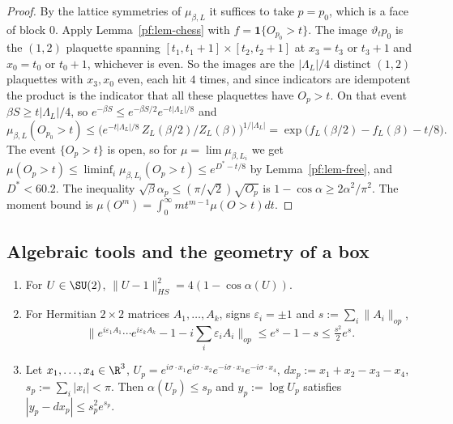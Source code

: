 \begin{proof}
By the lattice symmetries of $\mu_{\beta,L}$ it suffices to take $p=p_0$, which is a face of block $0$. Apply Lemma~\ref{pf:lem-chess} with $f=\mathbf 1\{O_{p_0}>t\}$. The image $\vartheta_tp_0$ is the $(1,2)$ plaquette spanning $[t_1,t_1+1]\times[t_2,t_2+1]$ at $x_3=t_3$ or $t_3+1$ and $x_0=t_0$ or $t_0+1$, whichever is even. So the images are the $|\Lambda_L|/4$ distinct $(1,2)$ plaquettes with $x_3,x_0$ even, each hit $4$ times, and since indicators are idempotent the product is the indicator that all these plaquettes have $O_p>t$. On that event $\beta S\ge t|\Lambda_L|/4$, so $e^{-\beta S}\le e^{-\beta S/2}e^{-t|\Lambda_L|/8}$ and
\[
\mu_{\beta,L}(O_{p_0}>t)\le\Big(e^{-t|\Lambda_L|/8}\,Z_L(\beta/2)/Z_L(\beta)\Big)^{1/|\Lambda_L|}=\exp\big(f_L(\beta/2)-f_L(\beta)-t/8\big).
\]
The event $\{O_p>t\}$ is open, so for $\mu=\lim\mu_{\beta,L_i}$ we get $\mu(O_p>t)\le\liminf_i\mu_{\beta,L_i}(O_p>t)\le e^{D^*-t/8}$ by Lemma~\ref{pf:lem-free}, and $D^*<60.2$. The inequality $\sqrt\beta\alpha_p\le(\pi/\sqrt2)\sqrt{O_p}$ is $1-\cos\alpha\ge2\alpha^2/\pi^2$. The moment bound is $\mu(O^m)=\int_0^\infty mt^{m-1}\mu(O>t)dt$.
\end{proof}

\subsection{Algebraic tools and the geometry of a box}\label{pf:sec-box}

\begin{lemma}\label{pf:lem-E}
\leavevmode
\begin{enumerate}
\item[(E1)] For $U\in\SU(2)$, $\|U-1\|_{HS}^2=4(1-\cos\alpha(U))$.
\item[(E2)] For Hermitian $2\times2$ matrices $A_1,\dots,A_k$, signs $\varepsilon_i=\pm1$ and $s:=\sum_i\|A_i\|_{op}$,
\[\big\|e^{i\varepsilon_1A_1}\cdots e^{i\varepsilon_kA_k}-1-i\textstyle\sum_i\varepsilon_iA_i\big\|_{op}\le e^s-1-s\le\tfrac{s^2}2e^s.\]
\item[(E3)] Let $x_1,\dots,x_4\in\R^3$, $U_p=e^{i\sigma\cdot x_1}e^{i\sigma\cdot x_2}e^{-i\sigma\cdot x_3}e^{-i\sigma\cdot x_4}$, $dx_p:=x_1+x_2-x_3-x_4$, $s_p:=\sum_i|x_i|<\pi$. Then $\alpha(U_p)\le s_p$ and $y_p:=\log U_p$ satisfies $|y_p-dx_p|\le s_p^2e^{s_p}$.
\end{enumerate}
\end{lemma}

